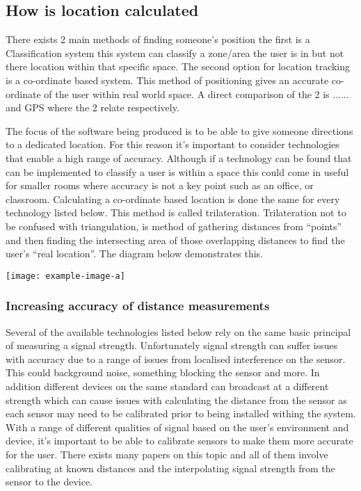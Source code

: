 \subsection{How is location calculated}
There exists 2 main methods of finding someone’s position the first is a Classification system this system can classify a zone/area the user is in but not there location within that specific space. The second option for location tracking is a co-ordinate based system. This method of positioning gives an accurate co-ordinate of the user within real world space. A direct comparison of the 2 is ...... and GPS where the 2 relate respectively.

The focus of the software being produced is to be able to give someone directions to a dedicated location. For this reason it’s important to consider technologies that enable a high range of accuracy. Although if a technology can be found that can be implemented to classify a user is within a space this could come in useful for smaller rooms where accuracy is not a key point such as an office, or classroom.
Calculating a co-ordinate based location is done the same for every technology listed below. This method is called trilateration. Trilateration not to be confused with triangulation, is method of gathering distances from “points” and then finding the intersecting area of those overlapping distances to find the user’s “real location”. The diagram below demonstrates this.
\begin{center}
	\texttt{[image: example-image-a]}
\end{center}
\subsubsection{Increasing accuracy of distance measurements}
Several of the available technologies listed below rely on the same basic principal of measuring a signal strength. Unfortunately signal strength can suffer issues with accuracy due to a range of issues from localised interference on the sensor. This could background noise, something blocking the sensor and more. In addition different devices on the same standard can broadcast at a different strength which can cause issues with calculating the distance from the sensor as each sensor may need to be calibrated prior to being installed withing the system. With a range of different qualities of signal based on the user’s environment and device, it’s important to be able to calibrate sensors to make them more accurate for the user. There exists many papers on this topic and all of them involve calibrating at known distances and the interpolating signal strength from the sensor to the device. 